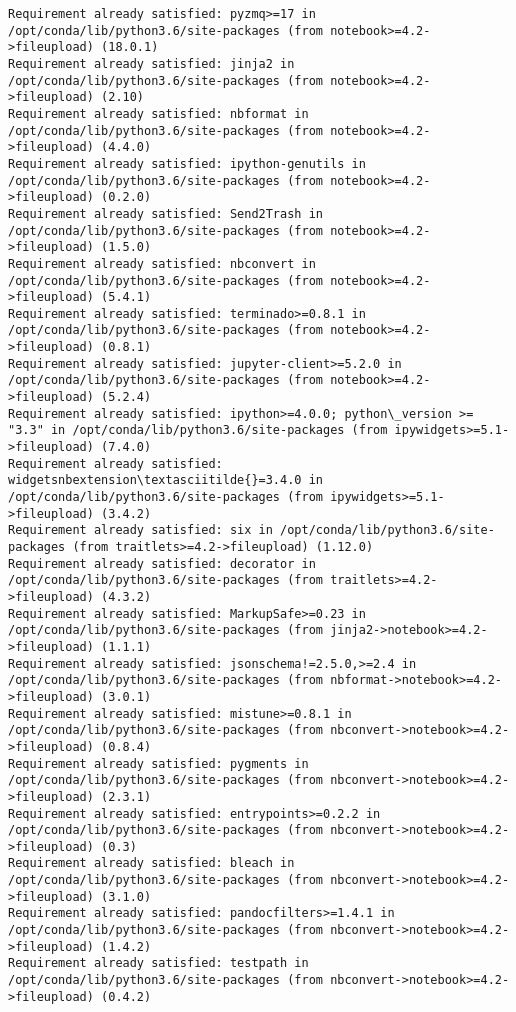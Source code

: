 \documentclass[11pt]{article}
\begin{document}
\begin{Verbatim}[commandchars=\\\{\}]
Requirement already satisfied: pyzmq>=17 in /opt/conda/lib/python3.6/site-packages (from notebook>=4.2->fileupload) (18.0.1)
Requirement already satisfied: jinja2 in /opt/conda/lib/python3.6/site-packages (from notebook>=4.2->fileupload) (2.10)
Requirement already satisfied: nbformat in /opt/conda/lib/python3.6/site-packages (from notebook>=4.2->fileupload) (4.4.0)
Requirement already satisfied: ipython-genutils in /opt/conda/lib/python3.6/site-packages (from notebook>=4.2->fileupload) (0.2.0)
Requirement already satisfied: Send2Trash in /opt/conda/lib/python3.6/site-packages (from notebook>=4.2->fileupload) (1.5.0)
Requirement already satisfied: nbconvert in /opt/conda/lib/python3.6/site-packages (from notebook>=4.2->fileupload) (5.4.1)
Requirement already satisfied: terminado>=0.8.1 in /opt/conda/lib/python3.6/site-packages (from notebook>=4.2->fileupload) (0.8.1)
Requirement already satisfied: jupyter-client>=5.2.0 in /opt/conda/lib/python3.6/site-packages (from notebook>=4.2->fileupload) (5.2.4)
Requirement already satisfied: ipython>=4.0.0; python\_version >= "3.3" in /opt/conda/lib/python3.6/site-packages (from ipywidgets>=5.1->fileupload) (7.4.0)
Requirement already satisfied: widgetsnbextension\textasciitilde{}=3.4.0 in /opt/conda/lib/python3.6/site-packages (from ipywidgets>=5.1->fileupload) (3.4.2)
Requirement already satisfied: six in /opt/conda/lib/python3.6/site-packages (from traitlets>=4.2->fileupload) (1.12.0)
Requirement already satisfied: decorator in /opt/conda/lib/python3.6/site-packages (from traitlets>=4.2->fileupload) (4.3.2)
Requirement already satisfied: MarkupSafe>=0.23 in /opt/conda/lib/python3.6/site-packages (from jinja2->notebook>=4.2->fileupload) (1.1.1)
Requirement already satisfied: jsonschema!=2.5.0,>=2.4 in /opt/conda/lib/python3.6/site-packages (from nbformat->notebook>=4.2->fileupload) (3.0.1)
Requirement already satisfied: mistune>=0.8.1 in /opt/conda/lib/python3.6/site-packages (from nbconvert->notebook>=4.2->fileupload) (0.8.4)
Requirement already satisfied: pygments in /opt/conda/lib/python3.6/site-packages (from nbconvert->notebook>=4.2->fileupload) (2.3.1)
Requirement already satisfied: entrypoints>=0.2.2 in /opt/conda/lib/python3.6/site-packages (from nbconvert->notebook>=4.2->fileupload) (0.3)
Requirement already satisfied: bleach in /opt/conda/lib/python3.6/site-packages (from nbconvert->notebook>=4.2->fileupload) (3.1.0)
Requirement already satisfied: pandocfilters>=1.4.1 in /opt/conda/lib/python3.6/site-packages (from nbconvert->notebook>=4.2->fileupload) (1.4.2)
Requirement already satisfied: testpath in /opt/conda/lib/python3.6/site-packages (from nbconvert->notebook>=4.2->fileupload) (0.4.2)

\end{Verbatim}
\end{document}

